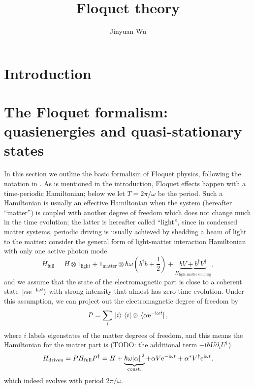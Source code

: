 \documentclass[hyperref, a4paper]{article}
\title{Floquet theory}
\author{Jinyuan Wu}
\newcommand*{\ii}{\mathrm{i}}
\newcommand*{\ee}{\mathrm{e}}
\newcommand*{\const}{\mathrm{const}}
\begin{document}
\maketitle

\section{Introduction} 

\section{The Floquet formalism: quasienergies and quasi-stationary states}

In this section we outline the basic formalism of Floquet physics,
following the notation in \cite{rudner2020floquet}.
As is mentioned in the introduction,
Floquet effects happen with a time-periodic Hamiltonian;
below we let $T = 2 \pi / \omega$ be the period.
Such a Hamiltonian is usually an effective Hamiltonian
when the system (hereafter ``matter'')
is coupled with another degree of freedom
which does not change much in the time evolution;
the latter is hereafter called ``light'',
since in condensed matter systems, 
periodic driving is usually achieved by 
shedding a beam of light to the matter:
consider the general form of light-matter interaction Hamiltonian 
with only one active photon mode
\begin{equation}
    H_{\text{full}} = 
    H \otimes 1_{\text{light}} + 1_{\text{matter}} \otimes \hbar \omega \left(
        b^\dagger b + \frac{1}{2} 
    \right) 
    + \underbrace{
        b V + b^\dagger V^\dagger  
    }_{H_{\text{light-matter coupling}}} ,
    \label{eq:full-light-matter}
\end{equation}
and we assume that the state of the electromagnetic part 
is close to a coherent state $\ket*{\alpha \ee^{- \ii \omega t}}$ 
with strong intensity that almost has zero time evolution. 
Under this assumption, we can project out the electromagnetic degree of freedom by 
\begin{equation}
    P = \sum_{i} \ket*{i} \bra*{i} \otimes \bra*{\alpha \ee^{- \ii \omega t}}, 
    \label{eq:from-extended-to-matter}
\end{equation} 
where $i$ labels eigenstates of the matter degrees of freedom,
and this means the Hamiltonian for the matter part is (TODO: the additional term $- \ii \hbar U \partial_t U^\dagger$)
\begin{equation}
    H_{\text{driven}} = P H_{\text{full}} P^\dagger = 
    H + \underbrace{\hbar \omega \abs*{\alpha}^2 }_{\const.} + \alpha V \ee^{- \ii \omega t} + \alpha^* V^\dagger \ee^{\ii \omega t},
\end{equation}
which indeed evolves with period $2\pi / \omega$.
\end{document}

